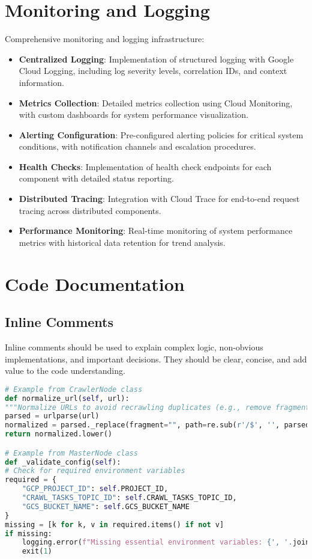 \documentclass[12pt,a4paper]{report}
\begin{document}
\section{Monitoring and Logging}
Comprehensive monitoring and logging infrastructure:
\begin{itemize}
    \item \textbf{Centralized Logging}: Implementation of structured logging with Google Cloud Logging, including log severity levels, correlation IDs, and context information.
    \item \textbf{Metrics Collection}: Detailed metrics collection using Cloud Monitoring, with custom dashboards for system performance visualization.
    \item \textbf{Alerting Configuration}: Pre-configured alerting policies for critical system conditions, with notification channels and escalation procedures.
    \item \textbf{Health Checks}: Implementation of health check endpoints for each component with detailed status reporting.
    \item \textbf{Distributed Tracing}: Integration with Cloud Trace for end-to-end request tracing across distributed components.
    \item \textbf{Performance Monitoring}: Real-time monitoring of system performance metrics with historical data retention for trend analysis.
\end{itemize}


\section{Code Documentation}
\subsection{Inline Comments}
Inline comments should be used to explain complex logic, non-obvious implementations, and important decisions. They should be clear, concise, and add value to the code understanding.

\begin{lstlisting}[language=Python]
# Example from CrawlerNode class
def normalize_url(self, url):
"""Normalize URLs to avoid recrawling duplicates (e.g., remove fragments, trailing slashes)."""
parsed = urlparse(url)
normalized = parsed._replace(fragment="", path=re.sub(r'/$', '', parsed.path)).geturl()
return normalized.lower()

# Example from MasterNode class
def _validate_config(self):
# Check for required environment variables
required = {
    "GCP_PROJECT_ID": self.PROJECT_ID,
    "CRAWL_TASKS_TOPIC_ID": self.CRAWL_TASKS_TOPIC_ID,
    "GCS_BUCKET_NAME": self.GCS_BUCKET_NAME
}
missing = [k for k, v in required.items() if not v]
if missing:
    logging.error(f"Missing essential environment variables: {', '.join(missing)}")
    exit(1)
\end{lstlisting}
\end{document}
